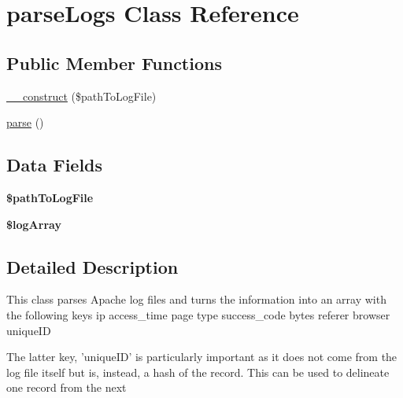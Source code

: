 \hypertarget{classparse_logs}{\section{parse\-Logs Class Reference}
\label{classparse_logs}
}
\subsection*{Public Member Functions}
\begin{DoxyCompactItemize}
\item 
\hyperlink{classparse_logs_a9daae4f248534e4f57d73b95d42e0074}{\-\_\-\-\_\-construct} (\$path\-To\-Log\-File)
\item 
\hyperlink{classparse_logs_a38d99acc70a1d8fd8f94455743b2d237}{parse} ()
\end{DoxyCompactItemize}
\subsection*{Data Fields}
\begin{DoxyCompactItemize}
\item 
\hypertarget{classparse_logs_a25e6dc7fc232cca129d90601d12a8f90}{{\bfseries \$path\-To\-Log\-File}}\label{classparse_logs_a25e6dc7fc232cca129d90601d12a8f90}

\item 
\hypertarget{classparse_logs_aac524d5b4c88fa95c14c042624f225a3}{{\bfseries \$log\-Array}}\label{classparse_logs_aac524d5b4c88fa95c14c042624f225a3}

\end{DoxyCompactItemize}


\subsection{Detailed Description}
This class parses Apache log files and turns the information into an array with the following keys ip access\-\_\-time page type success\-\_\-code bytes referer browser unique\-I\-D

The latter key, 'unique\-I\-D' is particularly important as it does not come from the log file itself but is, instead, a hash of the record. This can be used to delineate one record from the next 

